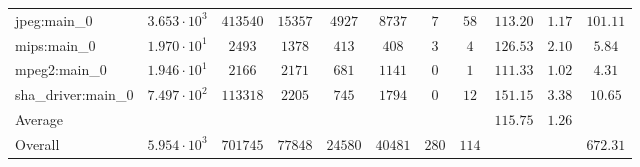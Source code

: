 \begin{tabular}{|l|c|c|c|c|c|c|c|c|c|c|}
jpeg:main\_0            & $ 3.653 \cdot 10^{3}  $ & $ 413540 $ & $ 15357 $ & $ 4927  $ & $ 8737  $ & $ 7   $ & $ 58  $ & $ 113.20      $ & $ 1.17    $ & $ 101.11  $ \\
mips:main\_0            & $ 1.970 \cdot 10^{1}  $ & $ 2493   $ & $ 1378  $ & $ 413   $ & $ 408   $ & $ 3   $ & $ 4   $ & $ 126.53      $ & $ 2.10    $ & $ 5.84    $ \\
mpeg2:main\_0           & $ 1.946 \cdot 10^{1}  $ & $ 2166   $ & $ 2171  $ & $ 681   $ & $ 1141  $ & $ 0   $ & $ 1   $ & $ 111.33      $ & $ 1.02    $ & $ 4.31    $ \\
sha\_driver:main\_0     & $ 7.497 \cdot 10^{2}  $ & $ 113318 $ & $ 2205  $ & $ 745   $ & $ 1794  $ & $ 0   $ & $ 12  $ & $ 151.15      $ & $ 3.38    $ & $ 10.65   $ \\
\hline
Average                 & $                     $ & $        $ & $       $ & $       $ & $       $ & $     $ & $     $ & $ 115.75      $ & $ 1.26    $ & $         $ \\
\hline
Overall                 & $ 5.954 \cdot 10^{3}  $ & $ 701745 $ & $ 77848 $ & $ 24580 $ & $ 40481 $ & $ 280 $ & $ 114 $ & $             $ & $         $ & $ 672.31  $ \\
\hline
\end{tabular}

